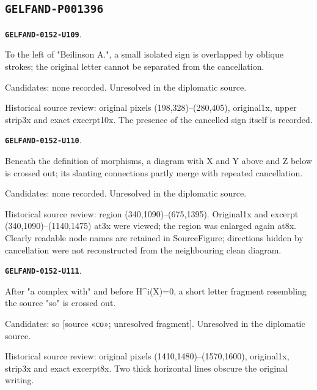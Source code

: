\documentclass[11pt]{article}
\theoremstyle{definition}
\theoremstyle{remark}
\begin{document}
\subsection*{\texttt{GELFAND-P001396}}
\par\noindent\leavevmode{}\label{GELFAND-0152-U109}\label{GELFAND-P001396:heading-cancellation:note}\textbf{\texttt{GELFAND-0152-U109}}.\nopagebreak[4]\par
To the left of "Beilinson A.", a small isolated sign is overlapped by oblique strokes; the original letter cannot be separated from the cancellation.\par
Candidates: none recorded. Unresolved in the diplomatic source.\par
Historical source review: original pixels (198,328)–(280,405), original1x, upper strip3x and exact excerpt10x. The presence of the cancelled sign itself is recorded.\par\medskip
\par\noindent\leavevmode{}\label{GELFAND-0152-U110}\label{GELFAND-P001396:roof-cancellation:note}\textbf{\texttt{GELFAND-0152-U110}}.\nopagebreak[4]\par
Beneath the definition of morphisms, a diagram with X and Y above and Z below is crossed out; its slanting connections partly merge with repeated cancellation.\par
Candidates: none recorded. Unresolved in the diplomatic source.\par
Historical source review: region (340,1090)–(675,1395). Original1x and excerpt (340,1090)–(1140,1475) at3x were viewed; the region was enlarged again at8x. Clearly readable node names are retained in SourceFigure; directions hidden by cancellation were not reconstructed from the neighbouring clean diagram.\par\medskip
\par\noindent\leavevmode{}\label{GELFAND-0152-U111}\label{GELFAND-P001396:example-cancellation:note}\textbf{\texttt{GELFAND-0152-U111}}.\nopagebreak[4]\par
After "a complex with" and before H\textasciicircum{}i(X)=0, a short letter fragment resembling the source "so" is crossed out.\par
Candidates: so [source «со»; unresolved fragment]. Unresolved in the diplomatic source.\par
Historical source review: original pixels (1410,1480)–(1570,1600), original1x, strip3x and exact excerpt8x. Two thick horizontal lines obscure the original writing.\par\medskip
\end{document}
